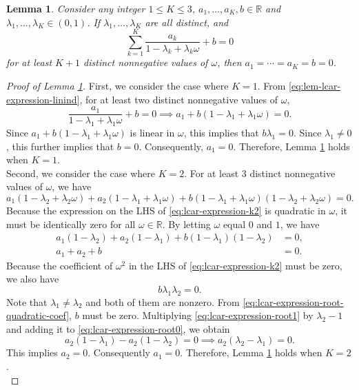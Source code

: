 \documentclass[11pt]{article}
\newtheorem{lemma}{Lemma}
\theoremstyle{definition}
\theoremstyle{remark}
\begin{document}
\begin{lemma}\label{lem:lcar-expression-linear-independence}
Consider any integer $1 \le K \le 3$, $a_1, \ldots, a_K, b \in \mathbb{R}$ and $\lambda_1,\ldots,\lambda_K \in  (0,1)$. If $\lambda_1,\ldots,\lambda_K$ are all distinct, and 
\begin{equation}\label{eq:lem-lcar-expression-linind}
\sum_{k=1}^K \frac{a_k}{1-\lambda_k+\lambda_k \omega} + b =0
\end{equation} 
for at least $K+1$ distinct nonnegative values of $\omega$, then $a_1=\cdots = a_K=b=0$.
\end{lemma}
\begin{proof}[Proof of Lemma \ref{lem:lcar-expression-linear-independence}]
First, we consider the case where $K=1$. From \eqref{eq:lem-lcar-expression-linind}, for at least two distinct nonnegative values of $\omega$,
\[\frac{a_1}{1-\lambda_1 + \lambda_1 \omega} + b =0 \implies a_1 + b(1-\lambda_1 + \lambda_1\omega)=0. \]
Since $a_1 + b(1-\lambda_1 + \lambda_1\omega)$ is linear in $\omega$, this implies that $b\lambda_1=0$. Since $\lambda_1\neq 0$, this further implies that $b=0$. Consequently, $a_1=0$.
Therefore, Lemma \ref{lem:lcar-expression-linear-independence} holds when $K=1$.
\\

Second, we consider the case where $K=2$. For at least 3 distinct nonnegative values of $\omega$, we have 
\begin{equation}\label{eq:lcar-expression-k2}
a_1(1-\lambda_2+\lambda_2\omega)+a_2(1-\lambda_1+\lambda_1\omega) + b(1-\lambda_1+\lambda_1\omega)(1-\lambda_2+\lambda_2 \omega)=0.
\end{equation} 
Because the expression on the LHS of \eqref{eq:lcar-expression-k2} is quadratic in $\omega$, it must be identically zero for all $\omega \in \mathbb{R}$. 
By letting $\omega$ equal $0$ and $1$, we have 
\begin{align}
    \label{eq:lcar-expression-root0}
a_1(1-\lambda_2)+a_2(1-\lambda_1)+b(1-\lambda_1)(1-\lambda_2) & =0,
\\
\label{eq:lcar-expression-root1}
a_1+a_2+b & = 0.
\end{align}
Because the coefficient of $\omega^2$ in the LHS of \eqref{eq:lcar-expression-k2} must be zero, we also have 
\begin{equation}\label{eq:lcar-expression-root-quadratic-coef}
b \lambda_1\lambda_2 =0.
\end{equation}
Note that $\lambda_1 \neq \lambda_2$ and both of them are nonzero. 
From \eqref{eq:lcar-expression-root-quadratic-coef}, $b$ must be zero. Multiplying \eqref{eq:lcar-expression-root1} by $\lambda_2-1$ and adding it to \eqref{eq:lcar-expression-root0}, we obtain
\[a_2(1-\lambda_1) -a_2(1-\lambda_2) =0 \implies a_2(\lambda_2-\lambda_1)=0. \] This implies $a_2=0$. Consequently $a_1=0$. Therefore, Lemma \ref{lem:lcar-expression-linear-independence} holds when $K=2$. \\


\end{proof}
\end{document}
